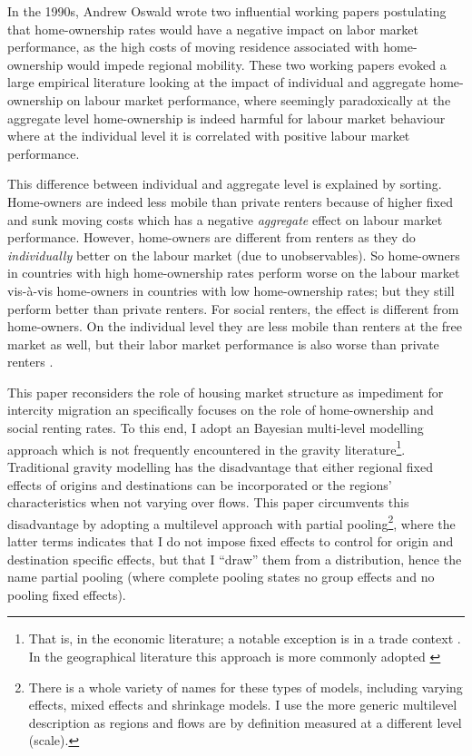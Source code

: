 \documentclass[12pt, parskip, abstracton,notitlepage]{scrartcl}
\begin{document}
In the 1990s, Andrew Oswald wrote two influential working papers
\citep{oswald1996conjecture, oswald1999housing} postulating
that home-ownership rates would have a negative impact on labor
market performance, as the high costs of moving residence
associated with home-ownership would impede regional
mobility. These two working papers evoked a large empirical
literature \citep[see, e.g., ][]{munch2006homeowners,
	munch2008home, de2013european} looking at the impact of
individual and aggregate home-ownership on labour market
performance, where seemingly paradoxically at the aggregate
level home-ownership is indeed harmful for labour market
behaviour where at the individual level it is correlated with
positive labour market performance.

This difference between individual and aggregate level is explained by
sorting. Home-owners are indeed less mobile than private renters
because of higher fixed and sunk moving costs which has a
negative \emph{aggregate} effect on labour market
performance. However, home-owners are different from renters
as they do \emph{individually} better on the labour market (due to
unobservables). So home-owners in countries with high home-ownership rates perform worse on the labour market vis-\`a-vis home-owners in countries with low home-ownership rates; but they still perform better than private renters. For social renters, the effect is different from home-owners. On the individual level they are less mobile than renters at the free market as well, but their labor market performance is also worse than private renters \citep{hughes1981council, de2009homeownership}.

This paper reconsiders the role of housing market structure as impediment for intercity migration an specifically focuses on the role of home-ownership and social renting rates. To this end, I adopt an Bayesian multi-level
modelling approach which is not frequently encountered in the
gravity literature\footnote{That is, in the economic literature; a notable exception is in a trade
	context \citet{ranjan2007bayesian}. In the geographical literature this approach is more commonly adopted \citep[see within a migration context][]{congdon2010random, congdon2012spatial}}. Traditional gravity modelling
has the disadvantage that either regional fixed effects of
origins and destinations can be incorporated or the regions'
characteristics when not varying over flows. This paper circumvents this disadvantage by adopting a
multilevel approach with partial pooling\footnote{There is a
	whole variety of names for these types of models, including
	varying effects, mixed effects and shrinkage models. I use
	the more generic multilevel description as regions and flows
	are by definition measured at a different level (scale).},
where the latter terms indicates that I do not impose fixed effects to control for
origin and destination specific effects, but that I ``draw''
them from a distribution, hence the name partial pooling
(where complete pooling states no group effects and no pooling
fixed effects).
\end{document}
